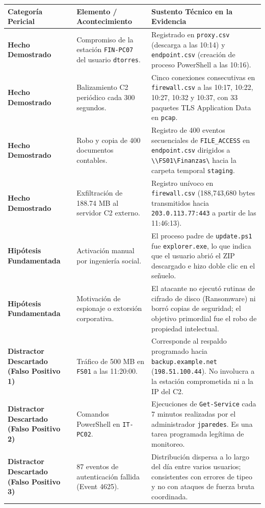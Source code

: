 \documentclass[11pt,a4paper]{article}
\begin{document}
\begin{longtable}{p{4.2cm} p{5.5cm} p{5.5cm}}
\toprule
\textbf{Categoría Pericial} & \textbf{Elemento / Acontecimiento} & \textbf{Sustento Técnico en la Evidencia} \\
\midrule
\endhead
\textbf{Hecho Demostrado} & Compromiso de la estación \texttt{FIN-PC07} del usuario \texttt{dtorres}. & Registrado en \texttt{proxy.csv} (descarga a las 10:14) y \texttt{endpoint.csv} (creación de proceso PowerShell a las 10:16). \\
\midrule
\textbf{Hecho Demostrado} & Balizamiento C2 periódico cada 300 segundos. & Cinco conexiones consecutivas en \texttt{firewall.csv} a las 10:17, 10:22, 10:27, 10:32 y 10:37, con 33 paquetes TLS Application Data en \texttt{pcap}. \\
\midrule
\textbf{Hecho Demostrado} & Robo y copia de 400 documentos contables. & Registro de 400 eventos secuenciales de \texttt{FILE\_ACCESS} en \texttt{endpoint.csv} dirigidos a \texttt{\textbackslash\textbackslash FS01\textbackslash Finanzas\textbackslash} hacia la carpeta temporal \texttt{staging}. \\
\midrule
\textbf{Hecho Demostrado} & Exfiltración de 188.74 MB al servidor C2 externo. & Registro unívoco en \texttt{firewall.csv} (188,743,680 bytes transmitidos hacia \texttt{203.0.113.77:443} a partir de las 11:46:13). \\
\midrule
\textbf{Hipótesis Fundamentada} & Activación manual por ingeniería social. & El proceso padre de \texttt{update.ps1} fue \texttt{explorer.exe}, lo que indica que el usuario abrió el ZIP descargado e hizo doble clic en el señuelo. \\
\midrule
\textbf{Hipótesis Fundamentada} & Motivación de espionaje o extorsión corporativa. & El atacante no ejecutó rutinas de cifrado de disco (Ransomware) ni borró copias de seguridad; el objetivo primordial fue el robo de propiedad intelectual. \\
\midrule
\textbf{Distractor Descartado (Falso Positivo 1)} & Tráfico de 500 MB en \texttt{FS01} a las 11:20:00. & Corresponde al respaldo programado hacia \texttt{backup.example.net} (\texttt{198.51.100.44}). No involucra a la estación comprometida ni a la IP del C2. \\
\midrule
\textbf{Distractor Descartado (Falso Positivo 2)} & Comandos PowerShell en \texttt{IT-PC02}. & Ejecuciones de \texttt{Get-Service} cada 7 minutos realizadas por el administrador \texttt{jparedes}. Es una tarea programada legítima de monitoreo. \\
\midrule
\textbf{Distractor Descartado (Falso Positivo 3)} & 87 eventos de autenticación fallida (Event 4625). & Distribución dispersa a lo largo del día entre varios usuarios; consistentes con errores de tipeo y no con ataques de fuerza bruta coordinada. \\
\bottomrule
\end{longtable}
\end{document}
